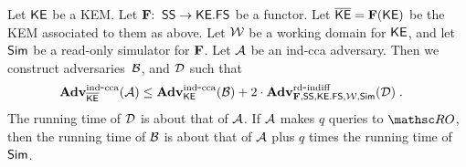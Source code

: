 \begin{theorem}\label{th-kem} Let ${\mathsf{KE}}$ be a KEM. Let $\mathbf{F} {:\;\;} \mathsf{SS} \to \mathsf{{\mathsf{KE}}.FS}$ be a functor. Let $\overline{\mathsf{KE}} = \mathbf{F}({\mathsf{KE}})$ be the KEM associated to them as above. Let ${\cal W}$ be a working domain for ${\mathsf{KE}}$, and let $\mathsf{Sim}$ be a read-only simulator for $\mathbf{F}$. Let $\mathcal{A}$ be an ind-cca adversary. Then we construct  adversaries~$\mathcal{B}$, and $\mathcal{D}$ such that
	\begin{align*}
		\mathbf{Adv}^{\mathrm{ind\mbox{-}cca}}_{\overline{\mathsf{KE}}}(\mathcal{A})
		& \leq
		\mathbf{Adv}^{\mathrm{ind\mbox{-}cca}}_{{\mathsf{KE}}}(\mathcal{B})
		+ 2 \cdot \mathbf{Adv}^{\mathrm{rd\mbox{-}indiff}}_{\mathbf{F},\mathsf{SS},\mathsf{{\mathsf{KE}}.FS},{\cal W},\mathsf{Sim}}(\mathcal{D}) \;.
\end{align*}
The running time of $\mathcal{D}$ is about that of $\mathcal{A}$. If $\mathcal{A}$ makes $q$ queries to $\RO$, then the running time of $\mathcal{B}$ is about that of $\mathcal{A}$ plus $q$ times the running time of $\mathsf{Sim}$. 
\end{theorem}



